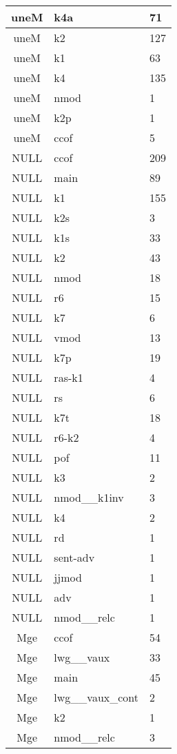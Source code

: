\documentclass[a4 paper]{article}
\begin{document}
\begin{longtable}{cp{}p{}}
uneM & k4a & 71\\ \midrule uneM & k2 & 127\\ \midrule uneM & k1 & 63\\ \midrule uneM & k4 & 135\\ \midrule uneM & nmod & 1\\ \midrule uneM & k2p & 1\\ \midrule uneM & ccof & 5\\ \midrule 
NULL & ccof & 209\\ \midrule NULL & main & 89\\ \midrule NULL & k1 & 155\\ \midrule NULL & k2s & 3\\ \midrule NULL & k1s & 33\\ \midrule NULL & k2 & 43\\ \midrule NULL & nmod & 18\\ \midrule NULL & r6 & 15\\ \midrule NULL & k7 & 6\\ \midrule NULL & vmod & 13\\ \midrule NULL & k7p & 19\\ \midrule NULL & ras-k1 & 4\\ \midrule NULL & rs & 6\\ \midrule NULL & k7t & 18\\ \midrule NULL & r6-k2 & 4\\ \midrule NULL & pof & 11\\ \midrule NULL & k3 & 2\\ \midrule NULL & nmod\_\_k1inv & 3\\ \midrule NULL & k4 & 2\\ \midrule NULL & rd & 1\\ \midrule NULL & sent-adv & 1\\ \midrule NULL & jjmod & 1\\ \midrule NULL & adv & 1\\ \midrule NULL & nmod\_\_relc & 1\\ \midrule 
Mge & ccof & 54\\ \midrule Mge & lwg\_\_vaux & 33\\ \midrule Mge & main & 45\\ \midrule Mge & lwg\_\_vaux\_cont & 2\\ \midrule Mge & k2 & 1\\ \midrule Mge & nmod\_\_relc & 3\\ \midrule 

\end{longtable}
\end{document}
